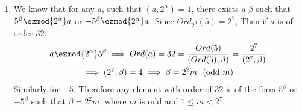 \begin{enumerate}[label=]
    \item 
        We know that for any $a$, such that $(a, 2^\alpha) = 1$, there exists a $\beta$ such that $5^\beta \ezmod{2^\alpha} a$ or $-5^\beta \ezmod{2^\alpha} a$. Since $Ord_{2^9}(5) = 2^7$, Then if $a$ is of order $32$:
        \begin{gather*}
            a \ezmod{2^\alpha} 5^\beta \implies Ord(a) = 32 = \frac{Ord(5)}{(Ord(5), \beta)} = \frac{2^7}{(2^7, \beta)} \\
            \implies (2^7, \beta) = 4 \implies \beta = 2^2 m \ \ (\text{odd $m$})
        \end{gather*}
        Similarly for $-5$. Therefore any element with order of $32$ is of the form $5^{\beta}$ or $-5^\beta$ such that $\beta = 2^2 m$, where $m$ is odd and $1 \le m < 2^7$.
\end{enumerate}
